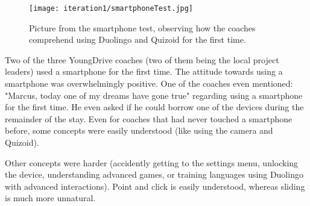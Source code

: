     \begin{figure}[h]
        \centering
        \texttt{[image: iteration1/smartphoneTest.jpg]}
        \caption{Picture from the smartphone test, observing how the coaches comprehend using Duolingo and Quizoid for the first time.}
        \label{fig:smartphoneTest}
    \end{figure}

    \clearpage

    Two of the three YoungDrive coaches (two of them being the local project leaders) used a smartphone for the first time. The attitude towards using a smartphone was overwhelmingly positive. One of the coaches even mentioned: "Marcus, today one of my dreams have gone true" regarding using a smartphone for the first time. He even asked if he could borrow one of the devices during the remainder of the stay. Even for coaches that had never touched a smartphone before, some concepts were easily understood (like using the camera and Quizoid).

    Other concepts were harder (accidently getting to the settings menu, unlocking the device, understanding advanced games, or training languages using Duolingo with advanced interactions). Point and click is easily understood, whereas sliding is much more unnatural.
